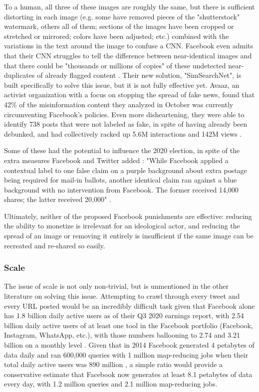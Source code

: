 \documentclass[preprint,review,12pt]{elsarticle}
\begin{document}
To a human, all three of these images are roughly the same, but there is sufficient distorting in each image (e.g. some have removed pieces of the "shutterstock" watermark, others all of them; sections of the images have been cropped or stretched or mirrored; colors have been adjusted; etc.) combined with the variations in the text around the image to confuse a CNN. Facebook even admits that their CNN struggles to tell the difference between near-identical images and that there could be "thousands or millions of copies" of these undetected near-duplicates of already flagged content \cite{sumbaly2020using}. Their new solution, "SimSearchNet", is built specifically to solve this issue, but it is not fully effective yet. Avaaz, an activist organization with a focus on stopping the spread of fake news, found that 42\% of the misinformation content they analyzed in October was currently circumventing Facebook's policies. Even more disheartening, they were able to identify 738 posts that were not labeled as fake, in spite of having already been debunked, and had collectively racked up 5.6M interactions and 142M views \cite{schott2020brief}.

Some of these had the potential to influence the 2020 election, in spite of the extra measures Facebook and Twitter added \cite{dean2020facebook}: "While Facebook applied a contextual label to one false claim on a purple background about extra postage being required for mail-in ballots, another identical claim ran against a blue background with no intervention from Facebook. The former received 14,000 shares; the latter received 20,000" \cite{Fung2020facebook}.

Ultimately, neither of the proposed Facebook punishments are effective: reducing the ability to monetize is irrelevant for an ideological actor, and reducing the spread of an image or removing it entirely is insufficient if the same image can be recreated and re-shared so easily.

\subsubsection{Scale}
\label{Scale Section}
The issue of scale is not only non-trivial, but is unmentioned in the other literature on solving this issue. Attempting to crawl through every tweet and every URL posted would be an incredibly difficult task given that Facebook alone has 1.8 billion daily active users as of their Q3 2020 earnings report, with 2.54 billion daily active users of at least one tool in the Facebook portfolio (Facebook, Instagram, WhatsApp, etc.), with those numbers ballooning to 2.74 and 3.21 billion on a monthly level \cite{facebook2020q3}. Given that in 2014 Facebook generated 4 petabytes of data daily and ran 600,000 queries with 1 million map-reducing jobs when their total daily active users was 890 million \cite{bronson2015open}, a simple ratio would provide a conservative estimate that Facebook now generates at least 8.1 petabytes of data every day, with 1.2 million queries and 2.1 million map-reducing jobs. 
\end{document}
